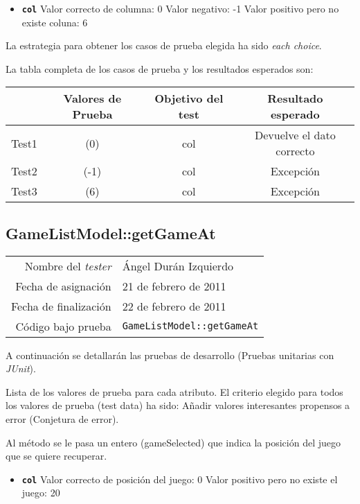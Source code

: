 \begin{itemize}
\item \textbf{\texttt{col}}
\subitem Valor correcto de columna: 0
\subitem Valor negativo: -1
\subitem Valor positivo pero no existe coluna: 6
\end{itemize}

La estrategia para obtener los casos de prueba elegida ha sido
\textit{each choice}.

La tabla completa de los casos de prueba y los resultados esperados son:

{\footnotesize
\begin{longtable}[c]{lccc}
 & \textbf{Valores de Prueba} & \textbf{Objetivo del test} & \textbf{Resultado esperado} \\
\hline \hline
\endhead

Test1 & (0) & col & Devuelve el dato correcto\\
Test2 & (-1) & col & Excepci\'on\\
Test3 & (6) & col & Excepci\'on\\

\hline
\end{longtable}
}

\subsection{GameListModel::getGameAt}

{\small
\begin{tabular}{r|l}
Nombre del \textit{tester} & \'Angel Dur\'an Izquierdo\\
Fecha de asignación & 21 de febrero de 2011 \\
Fecha de finalización & 22 de febrero de 2011 \\
Código bajo prueba & \texttt{GameListModel::getGameAt}
\end{tabular}
}

A continuación se detallarán las pruebas de desarrollo (Pruebas unitarias con \textit{JUnit}).

Lista de los valores de prueba para cada atributo.
El criterio elegido para todos los valores de prueba (test data) ha sido: Añadir valores interesantes propensos a error (Conjetura de error).

Al m\'etodo se le pasa un entero (gameSelected) que indica la posici\'on del juego que se quiere recuperar.

\begin{itemize}
\item \textbf{\texttt{col}}
\subitem Valor correcto de posici\'on del juego: 0
\subitem Valor positivo pero no existe el juego: 20
\end{itemize}

